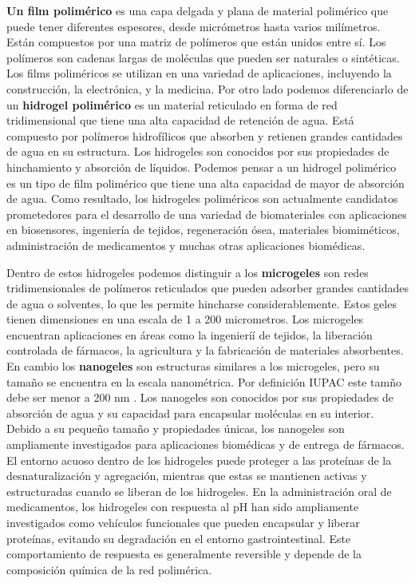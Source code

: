 \textbf{Un film polim\'erico} es una capa delgada y plana de material polim\'erico que puede tener diferentes espesores, desde micr\'ometros hasta varios mil\'imetros. Est\'an compuestos por una matriz de pol\'imeros que est\'an unidos entre s\'i. Los pol\'imeros son cadenas largas de mol\'eculas que pueden ser naturales o sint\'eticas. Los films polim\'ericos se utilizan en una variedad de aplicaciones, incluyendo la construcci\'on, la electr\'onica, y la medicina. \addcite
Por otro lado podemos diferenciarlo de un \textbf{hidrogel polim\'erico} es un material reticulado en forma de red tridimensional que tiene una alta capacidad de retenci\'on de agua. Est\'a compuesto por pol\'imeros hidrof\'ilicos que absorben y retienen grandes cantidades de agua en su estructura. Los hidrogeles son conocidos por sus propiedades de hinchamiento y absorci\'on de l\'iquidos.
Podemos pensar a un hidrogel polim\'erico es un tipo de film polim\'erico que tiene una alta capacidad de mayor de absorci\'on de agua. Como resultado, los hidrogeles polim\'ericos son actualmente candidatos prometedores para el desarrollo de una variedad de biomateriales con aplicaciones en biosensores, ingenier\'ia de tejidos, regeneraci\'on \'osea, materiales biomim\'eticos, administraci\'on de medicamentos y muchas otras aplicaciones biom\'edicas. \cite{Daly2020}
	
Dentro de estos hidrogeles podemos distinguir a los \textbf{microgeles} son redes tridimensionales de pol\'imeros reticulados que pueden adsorber grandes cantidades de agua o solventes, lo que les permite hincharse considerablemente. Estos geles tienen dimensiones en una escala de 1 a 200 micrometros. Los microgeles encuentran aplicaciones en áreas como la ingenierí\'i de tejidos, la liberaci\'on controlada de f\'armacos, la agricultura y la fabricaci\'on de materiales absorbentes. \addcite
En cambio los  \textbf{nanogeles} son estructuras similares a los microgeles, pero su tama\~no se encuentra en la escala nanom\'etrica. Por definici\'on IUPAC este tam\~no debe ser menor a 200 nm \addcite. Los nanogeles son conocidos por sus propiedades de absorci\'on de agua y su capacidad para encapsular mol\'eculas en su interior. Debido a su peque\~no tama\~no y propiedades \'unicas, los nanogeles son ampliamente investigados para aplicaciones biom\'edicas y de entrega de f\'armacos.
El entorno acuoso dentro de los hidrogeles puede proteger a las prote\'inas de la desnaturalizaci\'on y agregaci\'on, mientras que estas se mantienen activas y estructuradas cuando se liberan de los hidrogeles. \addcite
En la administraci\'on oral de medicamentos, los hidrogeles con respuesta al pH han sido ampliamente investigados como veh\'iculos funcionales que pueden encapsular y liberar prote\'inas, evitando su degradaci\'on en el entorno gastrointestinal. \addcite
Este comportamiento de respuesta es  generalmente reversible y depende de la composici\'on qu\'imica de la red polim\'erica.


